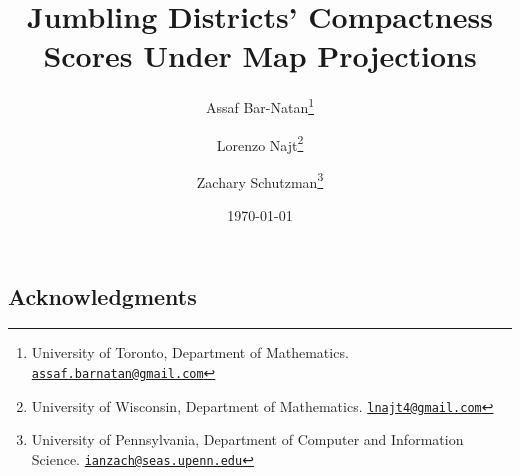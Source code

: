 \documentclass{article}
\title{Jumbling Districts' Compactness Scores Under Map Projections}
\date{\today}
\author{Assaf Bar-Natan\thanks{University of Toronto, Department of Mathematics. \href{mailto:assaf.barnatan@gmail.com}{\texttt{assaf.barnatan@gmail.com}}} 
	\and Lorenzo Najt\thanks{University of Wisconsin, Department of Mathematics. \href{mailto:lnajt4@gmail.com}{\texttt{lnajt4@gmail.com}}}  
	\and Zachary Schutzman\thanks{University of Pennsylvania, Department of Computer and Information Science. \href{mailto:ianzach@seas.upenn.edu}{\texttt{ianzach@seas.upenn.edu}}}  }
\theoremstyle{definition}
\theoremstyle{remark}
\newcommand{\mute}[1]{}
\begin{document}
\maketitle
\begin{abstract}

\end{abstract}
\ifarxiv
\else
\fi









%




%



\ifarxiv
\subsection*{Acknowledgments}


\else
\mute{
\begin{acknowledgment}{Acknowledgments}

\end{acknowledgment}
}
\fi





%
\end{document}
